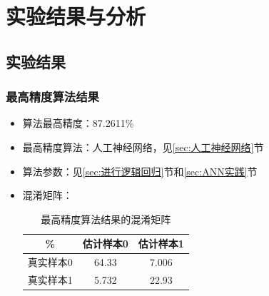 \documentclass[a4paper]{ctexart}
\begin{document}
\section{实验结果与分析}
\subsection{实验结果}
\subsubsection{最高精度算法结果}
\begin{itemize}
	\item 算法最高精度：87.2611\%
	\item 最高精度算法：人工神经网络，见\ref{sec:人工神经网络}节
	\item 算法参数：见\ref{sec:进行逻辑回归}节和\ref{sec:ANN实践}节
	\item 混淆矩阵：
	\begin{table}[htbp]
		\centering
		\caption{最高精度算法结果的混淆矩阵}\label{tab:混淆矩阵}
		\begin{tabular}{|c|c|c|}
			\hline
			\%&估计样本0&估计样本1\\
			\hline
			真实样本0&64.33&7.006\\
			\hline
			真实样本1&5.732&22.93\\
			\hline
		\end{tabular}
	\end{table}
\end{itemize}

\newpage
\end{document}
